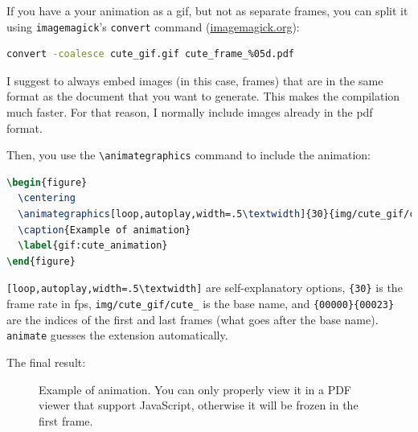 \documentclass{article}
\begin{document}
If you have a your animation as a gif, but not as separate frames, you can split it using \verb+imagemagick+'s \verb+convert+ command (\href{https://imagemagick.org/index.php}{imagemagick.org}):

\begin{minipage}{\linewidth}
\begin{lstlisting}[language=bash]
convert -coalesce cute_gif.gif cute_frame_%05d.pdf
\end{lstlisting}
\end{minipage}

I suggest to always embed images (in this case, frames) that are in the same format as the document that you want to generate. This makes the compilation much faster. For that reason, I normally include images already in the pdf format.

Then, you use the \verb+\animategraphics+ command to include the animation:

\begin{minipage}{\linewidth}
\begin{lstlisting}[language=tex]
\begin{figure}
  \centering
  \animategraphics[loop,autoplay,width=.5\textwidth]{30}{img/cute_gif/cute_frame_}{00000}{00023}
  \caption{Example of animation}
  \label{gif:cute_animation}
\end{figure}
\end{lstlisting}
\end{minipage}

\verb+[loop,autoplay,width=.5\textwidth]+ are self-explanatory options, \verb+{30}+ is the frame rate in fps, \verb+img/cute_gif/cute_+ is the base name, and \verb+{00000}{00023}+ are the indices of the first and last frames (what goes after the base name). \verb+animate+ guesses the extension automatically.

The final result:

\begin{figure}[!htbp]
  \centering
  \caption{Example of animation. You can only properly view it in a PDF viewer that support JavaScript, otherwise it will be frozen in the first frame.}
  \label{gif:cute_animation}
\end{figure}
\end{document}
